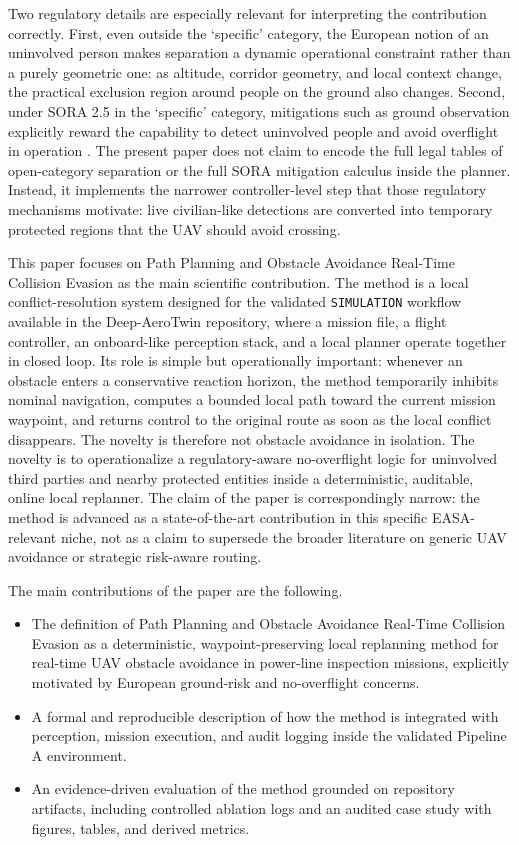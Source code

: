 \documentclass[a4paper,11pt]{article}
\begin{document}
Two regulatory details are especially relevant for interpreting the contribution correctly. First, even outside the `specific' category, the European notion of an uninvolved person makes separation a dynamic operational constraint rather than a purely geometric one: as altitude, corridor geometry, and local context change, the practical exclusion region around people on the ground also changes. Second, under SORA 2.5 in the `specific' category, mitigations such as ground observation explicitly reward the capability to detect uninvolved people and avoid overflight in operation \cite{JARUS_SORA_2_5_2024,EASA_AMC_GM_SORA25_2025}. The present paper does not claim to encode the full legal tables of open-category separation or the full SORA mitigation calculus inside the planner. Instead, it implements the narrower controller-level step that those regulatory mechanisms motivate: live civilian-like detections are converted into temporary protected regions that the UAV should avoid crossing.

This paper focuses on Path Planning and Obstacle Avoidance Real-Time Collision Evasion as the main scientific contribution. The method is a local conflict-resolution system designed for the validated \texttt{SIMULATION} workflow available in the Deep-AeroTwin repository, where a mission file, a flight controller, an onboard-like perception stack, and a local planner operate together in closed loop. Its role is simple but operationally important: whenever an obstacle enters a conservative reaction horizon, the method temporarily inhibits nominal navigation, computes a bounded local path toward the current mission waypoint, and returns control to the original route as soon as the local conflict disappears. The novelty is therefore not obstacle avoidance in isolation. The novelty is to operationalize a regulatory-aware no-overflight logic for uninvolved third parties and nearby protected entities inside a deterministic, auditable, online local replanner. The claim of the paper is correspondingly narrow: the method is advanced as a state-of-the-art contribution in this specific EASA-relevant niche, not as a claim to supersede the broader literature on generic UAV avoidance or strategic risk-aware routing.

The main contributions of the paper are the following.
\begin{itemize}[leftmargin=1.3em]
    \item The definition of Path Planning and Obstacle Avoidance Real-Time Collision Evasion as a deterministic, waypoint-preserving local replanning method for real-time UAV obstacle avoidance in power-line inspection missions, explicitly motivated by European ground-risk and no-overflight concerns.
    \item A formal and reproducible description of how the method is integrated with perception, mission execution, and audit logging inside the validated Pipeline A environment.
    \item An evidence-driven evaluation of the method grounded on repository artifacts, including controlled ablation logs and an audited case study with figures, tables, and derived metrics.
\end{itemize}
\end{document}
